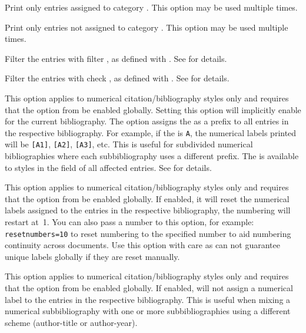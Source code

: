 \begin{optionlist*}

Print only entries assigned to category . This option may be used multiple times.


Print only entries not assigned to category . This option may be used multiple times.


Filter the entries with filter , as defined with . See  for details.


Filter the entries with check , as defined with . See  for details.


This option applies to numerical citation\slash bibliography styles only and requires that the  option from  be enabled globally. Setting this option will implicitly enable  for the current bibliography. The option assigns the  as a prefix to all entries in the respective bibliography. For example, if the  is \texttt{A}, the numerical labels printed will be \texttt{[A1]}, \texttt{[A2]}, \texttt{[A3]}, etc. This is useful for subdivided numerical bibliographies where each subbibliography uses a different prefix. The  is available to styles in the  field of all affected entries. See  for details.


This option applies to numerical citation\slash bibliography styles only and requires that the  option from  be enabled globally. If enabled, it will reset the numerical labels assigned to the entries in the respective bibliography, \ie the numbering will restart at~1. You can also pass a number to this option, for example: \texttt{resetnumbers=10} to reset numbering to the specified number to aid numbering continuity across documents. Use this option with care as \biblatex can not guarantee unique labels globally if they are reset manually.


This option applies to numerical citation\slash bibliography styles only and requires that the  option from  be enabled globally. If enabled, \biblatex will not assign a numerical label to the entries in the respective bibliography. This is useful when mixing a numerical subbibliography with one or more subbibliographies using a different scheme (\eg author-title or author-year).

\end{optionlist*}

